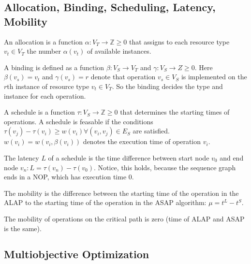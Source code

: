 \subsection{Allocation, Binding, Scheduling, Latency, Mobility}

\begin{definition}[Allocation]
An allocation is a function $\alpha : V_T \rightarrow \mathbb{Z} \geq 0$ that assigns to each resource type $v_t \in V_T$ the number $\alpha(v_t)$ of available instances.
\end{definition}

\begin{definition}[Binding]
A binding is defined as a function $\beta: V_S \rightarrow V_T $ and $\gamma : V_S \rightarrow Z \ge 0$. Here $\beta(v_s) = v_t$ and $\gamma(v_s) = r $ denote that operation $v_s \in V_S$ is implemented on the $r$th instance of resource type $v_t \in V_T$. So the binding decides the type and instance for each operation.
\end{definition}

\begin{definition}[Schedule]
A schedule is a function $\tau: V_S \rightarrow \mathbb{Z} \ge 0$ that determines the starting times of operations. A schedule is feasable if the conditions 
$ {\tau(v_j) - \tau(v_i) \geq w(v_i) \forall (v_i, v_j) \in E_S}$ are satisfied. $w(v_i) = w(v_i, \beta(v_i))$ denotes the execution time of operation $v_i$.
\end{definition}

\begin{definition}[Latency]
The latency $L$ of a schedule is the time difference between start node $v_0$ and end node $v_n: L = \tau(v_n)-\tau(v_0)$. Notice, this holds, because the sequence graph ends in a NOP, which has execution time 0.
\end{definition}

\begin{definition}[Mobility]
The mobility is the difference between the starting time of the operation in the ALAP to the starting time of the operation in the ASAP algorithm: $\mu = t^L - t^S$.

The mobility of operations on the critical path is zero (time of ALAP and ASAP is the same).
\end{definition}




\subsection{Multiobjective Optimization}

